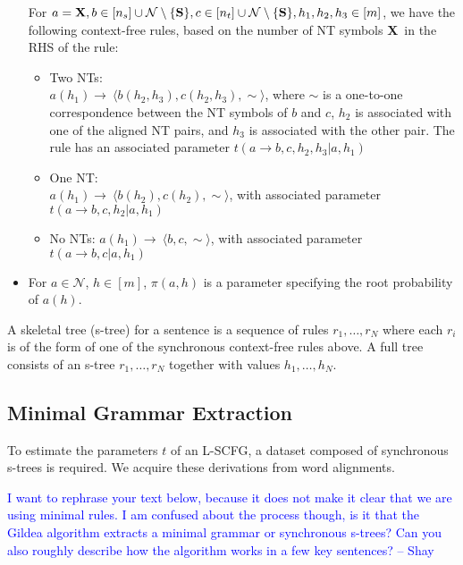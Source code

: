 \documentclass[11pt]{article}
\newcommand{\rules}{{\cal R}}
\newcommand{\bS}{{\bf S}}
\newcommand{\bX}{{\bf X}}
\newcommand{\shaycomment}[1]{\textcolor{blue}{#1 -- Shay}}
\begin{document}
\begin{itemize}
{For $a =\bX, b \in [n_s] \cup \mathcal{N} \setminus \{\bS\}, c \in [n_t]
     \cup \mathcal{N} \setminus \{\bS\}, h_1, h_2, h_3 \in [m]$, we have the following context-free rules, based on the number of NT symbols \bX~in the RHS of the rule:
     \begin{itemize}
       \item Two NTs: \\
	   $a(h_1) \rightarrow ~ \langle b(h_2, h_3), c(h_2, h_3), \sim \rangle$, where $\sim$ is a one-to-one correspondence between the NT symbols of $b$ and $c$, $h_2$ is associated with one of the aligned NT pairs, and $h_3$ is associated with the other pair.  
	   The rule has an associated parameter $t(a \rightarrow b,c, h_2, h_3 | a, h_1)$
       \item One NT: \\
	   	$a(h_1) \rightarrow ~\langle b(h_2), c(h_2), \sim \rangle$, with associated parameter $t(a \rightarrow b, c, h_2 | a, h_1)$
       \item No NTs:
	   	$a(h_1) \rightarrow ~ \langle b, c,\sim \rangle$, with associated parameter $t(a \rightarrow b,c | a, h_1)$
        \end{itemize}
}


         \item For $a \in \mathcal{N}$, $h \in [m]$, $\pi(a, h)$ is a parameter specifying the root probability of $a(h)$. 
\end{itemize}
A skeletal tree (s-tree) for a sentence is a sequence of rules $r_1, \dots, r_N$ where each $r_i$ is of the form of one of the synchronous context-free rules above. 
A full tree consists of an s-tree $r_1, \dots, r_N$ together with values $h_1, \dots, h_N$.  

\subsection{Minimal Grammar Extraction}
\label{sec:mingrammar}
To estimate the parameters $t$ of an L-SCFG, a dataset composed of synchronous s-trees is required.
We acquire these derivations from word alignments. 


\shaycomment{
I want to rephrase your text below, because it does not make it clear that we are using minimal rules.
I am confused about the process though, is it that the Gildea algorithm extracts a minimal grammar or synchronous s-trees?
Can you also roughly describe how the algorithm works in a few key sentences?}
\end{document}
